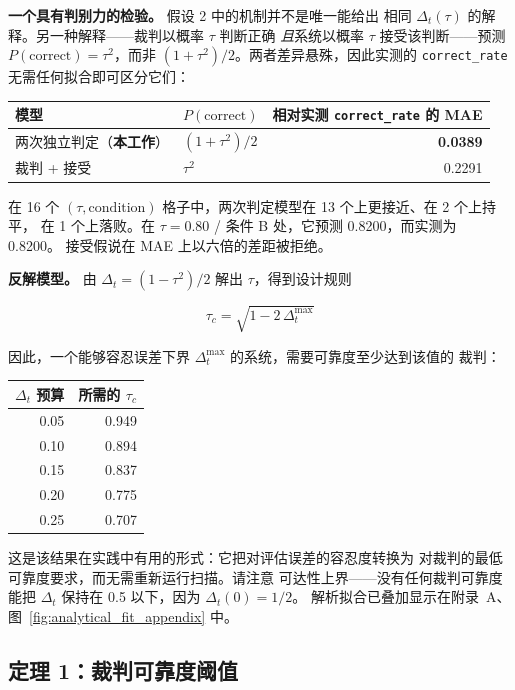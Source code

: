 \documentclass{article}
\begin{document}
\textbf{一个具有判别力的检验。} 假设 2 中的机制并不是唯一能给出
相同 $\Delta_t(\tau)$ 的解释。另一种解释——裁判以概率 $\tau$ 判断正确
\textit{且}系统以概率 $\tau$ 接受该判断——预测
$P(\text{correct}) = \tau^2$，而非 $(1+\tau^2)/2$。两者差异悬殊，因此实测的
\texttt{correct\_rate} 无需任何拟合即可区分它们：

\begin{center}
\small
\begin{tabular}{@{}llr@{}}
  \toprule
  模型 & $P(\text{correct})$ & 相对实测 \texttt{correct\_rate} 的 MAE \\
  \midrule
  两次独立判定（\textbf{本工作}） & $(1 + \tau^2)/2$ & \textbf{0.0389} \\
  裁判 + 接受 & $\tau^2$ & 0.2291 \\
  \bottomrule
\end{tabular}
\end{center}

在 16 个 $(\tau, \text{condition})$ 格子中，两次判定模型在 13 个上更接近、在 2 个上持平，
在 1 个上落败。在 $\tau = 0.80$ / 条件 B 处，它预测 0.8200，而实测为 0.8200。
接受假说在 MAE 上以六倍的差距被拒绝。

\textbf{反解模型。} 由 $\Delta_t = (1 - \tau^2)/2$ 解出 $\tau$，得到设计规则

\[
  \tau_c = \sqrt{1 - 2\,\Delta_t^{\max}}
\]

因此，一个能够容忍误差下界 $\Delta_t^{\max}$ 的系统，需要可靠度至少达到该值的
裁判：

\begin{center}
\small
\begin{tabular}{@{}rr@{}}
  \toprule
  $\Delta_t$ 预算 & 所需的 $\tau_c$ \\
  \midrule
  0.05 & 0.949 \\
  0.10 & 0.894 \\
  0.15 & 0.837 \\
  0.20 & 0.775 \\
  0.25 & 0.707 \\
  \bottomrule
\end{tabular}
\end{center}

这是该结果在实践中有用的形式：它把对评估误差的容忍度转换为
对裁判的最低可靠度要求，而无需重新运行扫描。请注意
可达性上界——没有任何裁判可靠度能把 $\Delta_t$ 保持在 0.5 以下，因为 $\Delta_t(0) = 1/2$。
解析拟合已叠加显示在附录~A、图~\ref{fig:analytical_fit_appendix} 中。

\subsection{定理 1：裁判可靠度阈值}
\label{sec:theorem1}
\end{document}
